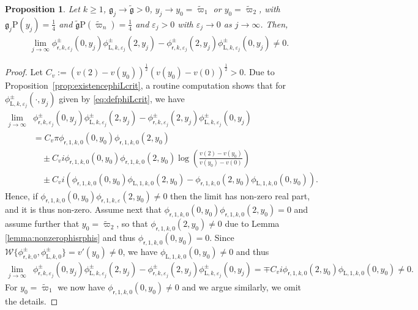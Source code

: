 \documentclass[11pt,reqno]{amsproc}
\newtheorem{proposition}{Proposition}[section]
\theoremstyle{definition}
\numberwithin{equation}{section}
\newcommand{\rL}{{\mathrm{L}}}
\newcommand{\sr}{{\mathsf{r}}}
\newcommand{\W}{{\mathcal{W}}}
\newcommand{\ep}{\varepsilon}
\newcommand{\g}{{\mathfrak{g}}}
\begin{document}
\begin{proposition}\label{prop:limitWronskianMildCrit}
Let $k\geq 1$,  $\g_j\rightarrow \tilde\g>0$, $y_j\rightarrow y_0=\tilde\varpi_1$ or $y_0=\tilde\varpi_2$, with $\g_j\mathrm{P}(y_j)=\frac14$ and $\tilde\g\mathrm{P}(\tilde\varpi_n)=\frac14$ and $\ep_j>0$ with $\ep_j\rightarrow 0$ as $j\rightarrow \infty$. Then,
\begin{align*}
\lim_{j\rightarrow\infty} \phi_{\sr,k,\ep_j}^\pm(0,y_j)\phi_{\rL,k,\ep_j}^\pm(2,y_j) - \phi_{\sr,k,\ep_j}^\pm(2,y_j)\phi_{\rL,k,\ep_j}^\pm(0,y_j) \neq 0.
\end{align*}
\end{proposition}

\begin{proof}
Let $C_v:=(v(2) - v(y_0))^\frac12 (v(y_0) - v(0))^\frac12>0$. Due to Proposition~\ref{prop:existencephiLcrit}, a routine computation shows that for $\phi_{\rL,k,\ep_j}^\pm(\cdot,y_j)$ given by \eqref{eq:defphiLcrit}, we have
\begin{align*}
\lim_{j\rightarrow\infty} &\phi_{\sr,k,\ep_j}^\pm(0,y_j)\phi_{\rL,k,\ep_j}^\pm(2,y_j) - \phi_{\sr,k,\ep_j}^\pm(2,y_j)\phi_{\rL,k,\ep_j}^\pm(0,y_j) \\
&= C_v\pi \phi_{\sr,1,k,0}(0,y_0) \phi_{\sr,1,k,0}(2,y_0) \\
&\quad \pm C_v i  \phi_{\sr,1,k,0}(0,y_0) \phi_{\sr,1,k,0}(2,y_0) \log \left( \frac{v(2) - v(y_0)}{v(y_0) - v(0)} \right) \\
&\quad \pm C_v i \left( \phi_{\sr,1,k,0}(0,y_0) \phi_{\rL,1,k,0}(2,y_0)  - \phi_{\sr,1,k,0}(2,y_0) \phi_{\rL,1,k,0}(0,y_0)  \right) .
\end{align*}
Hence, if $\phi_{\sr,1,k,0}(0,y_0) \phi_{\sr,1,k,\ep}(2,y_0) \neq 0$ then the limit has non-zero real part, and it is thus non-zero. Assume next that $\phi_{\sr,1,k,0}(0,y_0) \phi_{\sr,1,k,0}(2,y_0) =0$ and assume further that $y_0 = \widetilde\varpi_2$, so that $\phi_{\sr,1,k,0}(2,y_0) \neq 0$ due to Lemma \ref{lemma:nonzerophisrphis} and thus $\phi_{\sr,1,k,0}(0,y_0) =0$. Since $\W\lbrace \phi_{\sr,k,0}^\pm, \phi_{\rL,k,0}^\pm \rbrace = v'(y_0)\neq 0$, we have $\phi_{\rL,1,k,0}(0,y_0)\neq 0$ and thus
\begin{align*}
\lim_{j\rightarrow\infty} &\phi_{\sr,k,\ep_j}^\pm(0,y_j)\phi_{\rL,k,\ep_j}^\pm(2,y_j) - \phi_{\sr,k,\ep_j}^\pm(2,y_j)\phi_{\rL,k,\ep_j}^\pm(0,y_j) = \mp C_v i \phi_{\sr,1,k,0}(2,y_0) \phi_{\rL,1,k,0}(0,y_0) \neq 0.
\end{align*}
For $y_0=\widetilde\varpi_1$ we now have $\phi_{\sr,1,k,0}(0,y_0)\neq 0$ and we argue similarly, we omit the details.
\end{proof}
\end{document}
